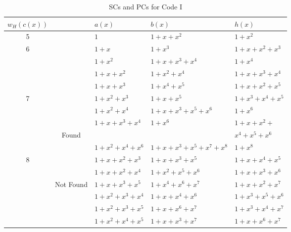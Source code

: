 \begin{table}[htbp]
		\caption{SCs and PCs for Code I}
		\centering
		\begin{tabularx}{1\textwidth}{|c|c|XXX} 
			\toprule
			$w_H(c(x))$&~& $a(x)$ & $b(x)$ & $h(x)$ \\ %
			\midrule
			5& ~&$1$ & $1+x+x^{2}$ & $1+x^2$\\
			\cline{1-5}
			6& ~&$1+x$ & $1+x^3$ & $1+x+x^2+x^3$\\
			&~ &$1+x^2$ & $1+x+x^3+x^4$ & $1+x^{4}$\\
			&~&$1+x+x^2$ & $1+x^2+x^4$ & $1+x+x^3+x^4$\\
			&~&$1+x+x^3$ & $1+x^4+x^5$ & $1+x+x^2+x^5$\\
			\cline{1-5}
			7&~&$1+x^2+x^3$ & $1+x+x^5$ & $1+x^3+x^4+x^5$\\
			&~&$1+x^2+x^4$ & $1+x+x^3+x^5+x^6$ & $1+x^{6}$\\			
			\cline{1-5}
			&~&$1+x+x^3+x^4$ & $1+x^6$ & $1+x+x^2+$\\
			&Found&&&$x^4+x^5+x^6$\\
			&~&$1+x^2+x^4+x^6$ & $1+x+x^3+x^5+x^7+x^8$ & $1+x^8$\\
			\cline{2-5}
			8&&$1+x+x^2+x^3$ 		&$1+x+x^3+x^5$ 		& $1+x+x^4+x^5$\\
			&&$1+x+x^2+x^4$ 		&$1+x^2+x^5+x^6$		& $1+x+x^3+x^6$\\
			&Not Found&$1+x+x^3+x^5$ 		&$1+x^4+x^6+x^7$ 		& $1+x+x^2+x^7$\\
			&&$1+x^2+x^3+x^4$ 	&$1+x+x^4+x^6$ 		& $1+x^3+x^5+x^6$\\
			&&$1+x^2+x^3+x^5$ 	&$1+x+x^6+x^7$ 		& $1+x^3+x^4+x^7$\\
			&&$1+x^2+x^4+x^5$ 	&$1+x+x^3+x^7$ 		& $1+x+x^6+x^7$\\
			\bottomrule
		\end{tabularx}		
		\label{code-tables-1}
	\end{table}


